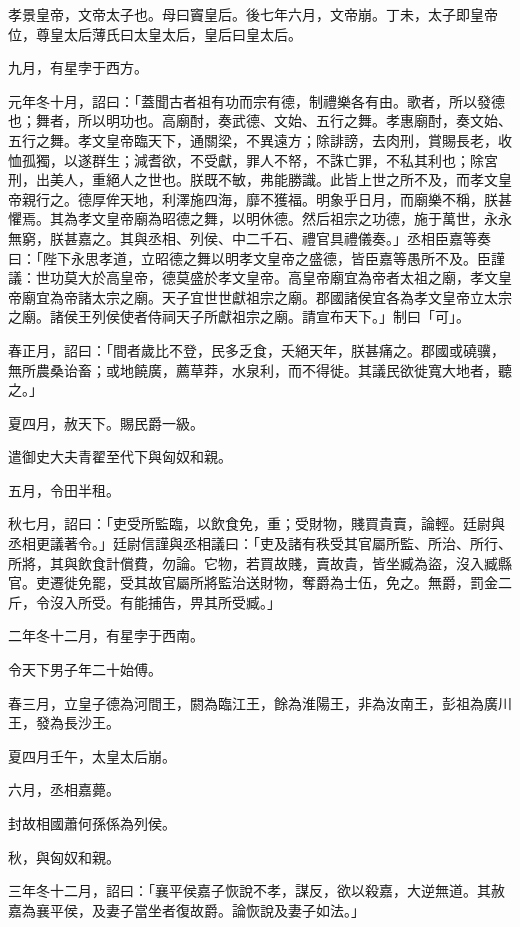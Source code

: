 
\begin{pinyinscope}
孝景皇帝，文帝太子也。母曰竇皇后。後七年六月，文帝崩。丁未，太子即皇帝位，尊皇太后薄氏曰太皇太后，皇后曰皇太后。

九月，有星孛于西方。

元年冬十月，詔曰：「蓋聞古者祖有功而宗有德，制禮樂各有由。歌者，所以發德也；舞者，所以明功也。高廟酎，奏武德、文始、五行之舞。孝惠廟酎，奏文始、五行之舞。孝文皇帝臨天下，通關梁，不異遠方；除誹謗，去肉刑，賞賜長老，收恤孤獨，以遂群生；減耆欲，不受獻，罪人不帑，不誅亡罪，不私其利也；除宮刑，出美人，重絕人之世也。朕既不敏，弗能勝識。此皆上世之所不及，而孝文皇帝親行之。德厚侔天地，利澤施四海，靡不獲福。明象乎日月，而廟樂不稱，朕甚懼焉。其為孝文皇帝廟為昭德之舞，以明休德。然后祖宗之功德，施于萬世，永永無窮，朕甚嘉之。其與丞相、列侯、中二千石、禮官具禮儀奏。」丞相臣嘉等奏曰：「陛下永思孝道，立昭德之舞以明孝文皇帝之盛德，皆臣嘉等愚所不及。臣謹議：世功莫大於高皇帝，德莫盛於孝文皇帝。高皇帝廟宜為帝者太祖之廟，孝文皇帝廟宜為帝諸太宗之廟。天子宜世世獻祖宗之廟。郡國諸侯宜各為孝文皇帝立太宗之廟。諸侯王列侯使者侍祠天子所獻祖宗之廟。請宣布天下。」制曰「可」。

春正月，詔曰：「間者歲比不登，民多乏食，夭絕天年，朕甚痛之。郡國或磽骥，無所農桑诒畜；或地饒廣，薦草莽，水泉利，而不得徙。其議民欲徙寬大地者，聽之。」

夏四月，赦天下。賜民爵一級。

遣御史大夫青翟至代下與匈奴和親。

五月，令田半租。

秋七月，詔曰：「吏受所監臨，以飲食免，重；受財物，賤買貴賣，論輕。廷尉與丞相更議著令。」廷尉信謹與丞相議曰：「吏及諸有秩受其官屬所監、所治、所行、所將，其與飲食計償費，勿論。它物，若買故賤，賣故貴，皆坐臧為盜，沒入臧縣官。吏遷徙免罷，受其故官屬所將監治送財物，奪爵為士伍，免之。無爵，罰金二斤，令沒入所受。有能捕告，畀其所受臧。」

二年冬十二月，有星孛于西南。

令天下男子年二十始傅。

春三月，立皇子德為河間王，閼為臨江王，餘為淮陽王，非為汝南王，彭祖為廣川王，發為長沙王。

夏四月壬午，太皇太后崩。

六月，丞相嘉薨。

封故相國蕭何孫係為列侯。

秋，與匈奴和親。

三年冬十二月，詔曰：「襄平侯嘉子恢說不孝，謀反，欲以殺嘉，大逆無道。其赦嘉為襄平侯，及妻子當坐者復故爵。論恢說及妻子如法。」


\end{pinyinscope}
